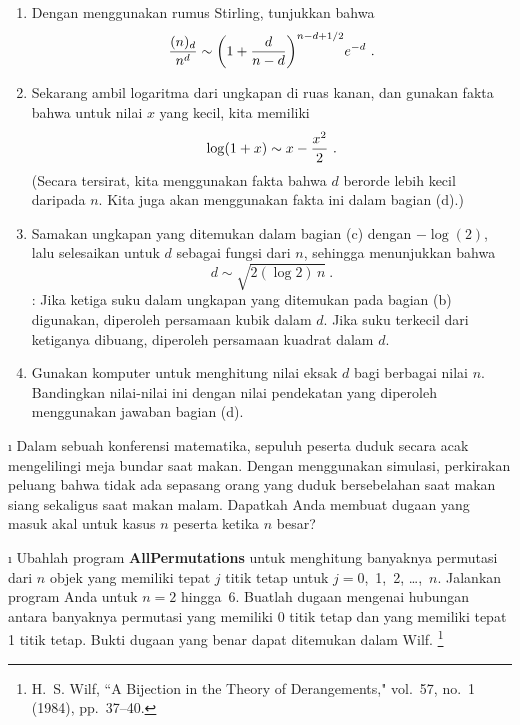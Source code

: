 \begin{LJSItem}
\begin{enumerate}
\item  Dengan menggunakan rumus Stirling, tunjukkan bahwa
$${{(n)_d}\over{n^d}} \sim \biggl(1 + {d\over{n-d}}\biggr)^{n-d + 1/2} e^{-d}\ .$$
\item Sekarang ambil logaritma dari ungkapan di ruas kanan, dan gunakan fakta bahwa
untuk nilai $x$ yang kecil, kita memiliki
$$\log(1+x) \sim x - {{x^2}\over 2}\ .$$ (Secara tersirat, kita menggunakan fakta bahwa
$d$ berorde lebih kecil daripada $n$.  Kita juga akan menggunakan fakta ini dalam bagian (d).)

\item Samakan ungkapan yang ditemukan dalam bagian (c) dengan $-\log(2)$, lalu
selesaikan untuk $d$ sebagai fungsi dari $n$, sehingga menunjukkan bahwa
$$d \sim \sqrt{2(\log 2)\,n}\ .$$ 
:  Jika ketiga suku dalam ungkapan yang ditemukan pada bagian (b)
digunakan, diperoleh persamaan kubik dalam $d$.  Jika suku terkecil dari ketiganya
dibuang, diperoleh persamaan kuadrat dalam $d$.

\item Gunakan komputer untuk menghitung nilai eksak $d$ bagi berbagai nilai $n$.
Bandingkan nilai-nilai ini dengan nilai pendekatan yang diperoleh menggunakan jawaban
bagian (d).
\end{enumerate}

\i\label{exer 3.1.20}  Dalam sebuah konferensi matematika, sepuluh peserta duduk secara
acak mengelilingi meja bundar saat makan.  Dengan menggunakan simulasi, perkirakan
peluang bahwa tidak ada sepasang orang yang duduk bersebelahan saat makan siang sekaligus
saat makan malam.  Dapatkah Anda membuat dugaan yang masuk akal untuk kasus $n$ peserta
ketika $n$ besar?

\i\label{exer 3.1.21} Ubahlah program {\bf AllPermutations} untuk menghitung banyaknya
permutasi dari $n$ objek yang memiliki tepat $j$ titik tetap untuk $j = 0$,~1,~2,
\dots,~$n$.  Jalankan program Anda untuk $n = 2$ hingga~6.  Buatlah dugaan mengenai
hubungan antara banyaknya permutasi yang memiliki 0 titik tetap dan yang memiliki tepat
1 titik tetap.  Bukti dugaan yang benar dapat ditemukan dalam Wilf.
\footnote{H.~S.
Wilf, ``A Bijection in the Theory of Derangements,"  vol.~57, no.~1
(1984), pp.~37--40. }


\end{LJSItem}

